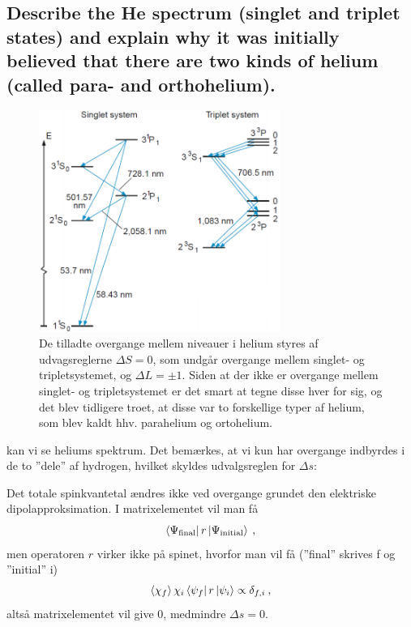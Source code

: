 \subsection{Describe the He spectrum (singlet and triplet states) and explain why it was initially believed that there are two kinds of helium (called para- and orthohelium).}


\begin{figure}[!h]
    \centering
    \includegraphics[width=0.7\textwidth]{Q12/images/SingletOgtripletTilstandeIHelium.PNG}
    \caption{De tilladte overgange mellem niveauer i helium styres af udvagsreglerne $\Delta S = 0$, som undgår overgange mellem singlet- og tripletsystemet, og $\Delta L = \pm 1$. Siden at der ikke er overgange mellem singlet- og tripletsystemet er det smart at tegne disse hver for sig, og det blev tidligere troet, at disse var to forskellige typer af helium, som blev kaldt hhv. parahelium og ortohelium.}
    \label{fig:Q12_SingletOgTripletTilstandeIHelium}
\end{figure}

 kan vi se heliums spektrum. Det bemærkes, at vi kun har overgange indbyrdes i de to ''dele'' af hydrogen, hvilket skyldes udvalgsreglen for $\Delta s$:

Det totale spinkvantetal ændres ikke ved overgange grundet den elektriske dipolapproksimation. I matrixelementet vil man få
\begin{align}
    \bra{\Psi_\text{final}}r\ket{\Psi_\text{initial}} \: ,
\end{align}
men operatoren $r$ virker ikke på spinet, hvorfor man vil få (''final'' skrives f og ''initial'' i)
\begin{align}
    \Braket{\chi_f}{\chi_i}\bra{\psi_f}r\ket{\psi_i} \propto \delta_{f,i} \: ,
\end{align}
altså matrixelementet vil give 0, medmindre $\Delta s = 0$.

